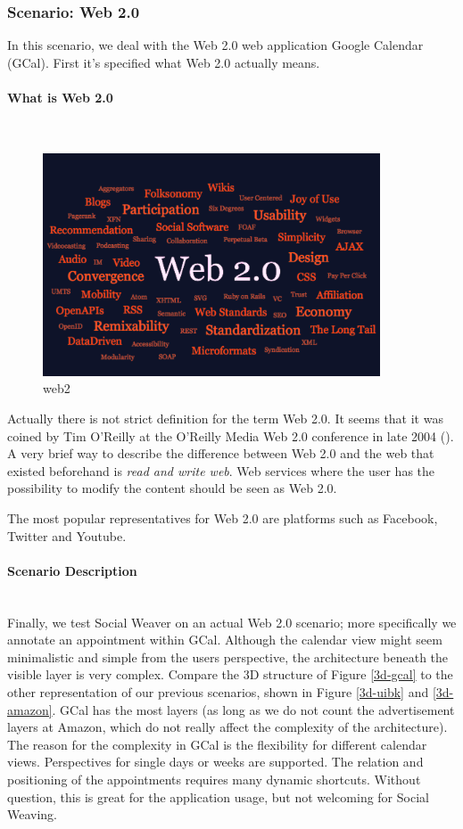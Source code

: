 \subsubsection{Scenario: Web 2.0}\label{web2-scenario}
In this scenario, we deal with the Web 2.0 web application Google Calendar (GCal). First it's specified what Web 2.0 actually means.

\paragraph{What is Web 2.0}\mbox{}\\
\begin{figure}\centering
		\includegraphics[width=10cm]{images/web2.png}
		\caption{web2}
		\label{Web 2.0 tag cloud - a common Web 2.0 feature itself.}
\end{figure} 

Actually there is not strict definition for the term Web 2.0. It seems that it was coined by Tim O'Reilly at the O'Reilly Media Web 2.0 conference in late 2004 (\cite{o2005web}). A very brief way to describe the difference between Web 2.0 and the web that existed beforehand is \emph{read and write web}. Web services where the user has the possibility to modify the content should be seen as Web 2.0. 

The most popular representatives for Web 2.0 are platforms such as Facebook, Twitter and Youtube.

\paragraph{Scenario Description}\mbox{}\\
Finally, we test Social Weaver on an actual Web 2.0 scenario; more specifically we annotate an appointment within GCal. Although the calendar view might seem minimalistic and simple from the users perspective, the architecture beneath the visible layer is very complex. Compare the 3D structure of Figure \ref{3d-gcal} to the other representation of our previous scenarios, shown in Figure \ref{3d-uibk} and \ref{3d-amazon}. GCal has the most layers (as long as we do not count the advertisement layers at Amazon, which do not really affect the complexity of the architecture). The reason for the complexity in GCal is the flexibility for different calendar views. Perspectives for single days or weeks are supported. The relation and positioning of the appointments requires many dynamic shortcuts. Without question, this is great for the application usage, but not welcoming for Social Weaving. 

